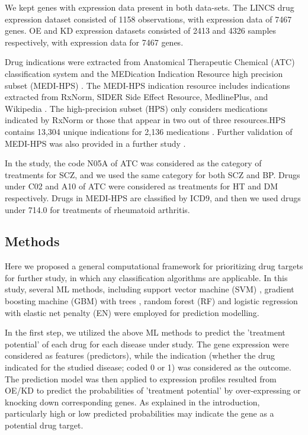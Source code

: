     We kept genes with expression data present in both data-sets. The LINCS drug expression dataset consisted of 1158 observations, with expression data of 7467 genes. OE and KD expression datasets consisted of 2413 and 4326 samples respectively, with expression data for 7467 genes. 

    Drug indications were extracted from Anatomical Therapeutic Chemical (ATC) classification system and the MEDication Indication Resource high precision subset (MEDI-HPS) \cite{wei2013development}. The MEDI-HPS indication resource includes indications extracted from RxNorm, SIDER Side Effect Resource, MedlinePlus, and Wikipedia \cite{wei2013development}. The high-precision subset (HPS) only considers medications indicated by RxNorm or those that appear in two out of three resources.HPS contains 13,304 unique indications for 2,136 medications \cite{wei2013development}. Further validation of MEDI-HPS was also provided in a further study \cite{wei2013validation}. 

    In the study, the code N05A of ATC was considered as the category of treatments for SCZ, and we used the same category for both SCZ and BP. Drugs under C02 and A10 of ATC were considered as treatments for HT and DM respectively. Drugs in MEDI-HPS are classified by ICD9, and then we used drugs under 714.0 for treatments of rheumatoid arthritis.

  \subsection{Methods}
    Here we proposed a general computational framework for prioritizing drug targets for further study, in which any classification algorithms are applicable. In this study, several ML methods, including support vector machine (SVM) \cite{cortes1995support}, gradient boosting machine (GBM) with trees \cite{friedman2001greedy}, random forest (RF) \cite{breiman2001random} and logistic regression with elastic net penalty (EN) \cite{zou2005regularization} were employed for prediction modelling. 

    In the first step, we utilized the above ML methods to predict the 'treatment potential' of each drug for each disease under study. The gene expression were considered as features (predictors), while the indication (whether the drug indicated for the studied disease; coded 0 or 1) was considered as the outcome.  The prediction model was then applied to expression profiles resulted from OE/KD to predict the probabilities of 'treatment potential' by over-expressing or knocking down corresponding genes. As explained in the introduction, particularly high or low predicted probabilities may indicate the gene as a potential drug target. 


